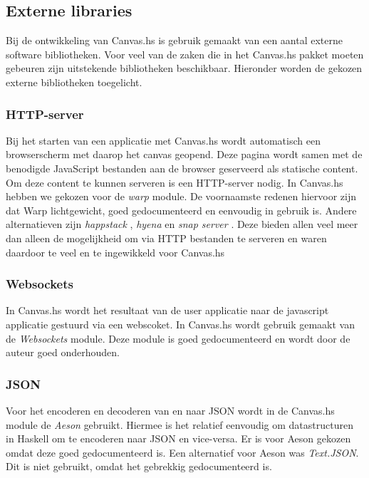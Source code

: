 \subsection{Externe libraries}
\label{subsec:externe_libraries}
Bij de ontwikkeling van Canvas.hs is gebruik gemaakt van een aantal externe software bibliotheken. Voor veel van de zaken die in het Canvas.hs pakket moeten gebeuren zijn uitstekende bibliotheken beschikbaar. Hieronder worden de gekozen externe bibliotheken toegelicht.

\subsubsection{HTTP-server}
Bij het starten van een applicatie met Canvas.hs wordt automatisch een browserscherm met daarop het canvas geopend. Deze pagina wordt samen met de benodigde JavaScript bestanden aan de browser geserveerd als statische content. Om deze content te kunnen serveren is een HTTP-server nodig. In Canvas.hs hebben we gekozen voor de \emph{warp} \cite{Warp} module. De voornaamste redenen hiervoor zijn dat Warp lichtgewicht, goed gedocumenteerd en eenvoudig in gebruik is. Andere alternatieven zijn \emph{happstack} \cite{Happstack}, \emph{hyena} \cite{Hyena} en \emph{snap server} \cite{SnapServer}. Deze bieden allen veel meer dan alleen de mogelijkheid om via HTTP bestanden te serveren en waren daardoor te veel en te ingewikkeld voor Canvas.hs

\subsubsection{Websockets}
In Canvas.hs wordt het resultaat van de user applicatie naar de javascript applicatie gestuurd via een webscoket. In Canvas.hs wordt gebruik gemaakt van de \emph{Websockets}  \cite{Websockets} module. Deze module is goed gedocumenteerd en wordt door de auteur goed onderhouden.

\subsubsection{JSON}
Voor het encoderen en decoderen van en naar JSON wordt in de Canvas.hs module de \emph{Aeson} \cite{Aeson} gebruikt. Hiermee is het relatief eenvoudig om datastructuren in Haskell om te encoderen naar JSON en vice-versa. Er is voor Aeson gekozen omdat deze goed gedocumenteerd is. Een alternatief voor Aeson was \emph{Text.JSON}. Dit is niet gebruikt, omdat het gebrekkig gedocumenteerd is.

